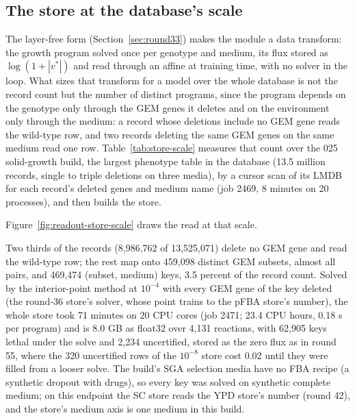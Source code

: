 \subsection{The store at the database's scale}
\label{sec:store-scale}

The layer-free form (Section~\ref{sec:round33}) makes the module a data transform: the
growth program solved once per genotype and medium, its flux stored as
$\log(1 + |v^*|)$ and read through an affine at training time, with no solver in the
loop. What sizes that transform for a model over the whole database is not the record
count but the number of distinct programs, since the program depends on the genotype
only through the GEM genes it deletes and on the environment only through the medium:
a record whose deletions include no GEM gene reads the wild-type row, and two records
deleting the same GEM genes on the same medium read one row. Table~\ref{tab:store-scale}
measures that count over the 025 solid-growth build, the largest phenotype table in the
database (13.5 million records, single to triple deletions on three media), by a cursor
scan of its LMDB for each record's deleted genes and medium name (job 2469, 8 minutes
on 20 processes), and then builds the store.

Figure~\ref{fig:readout-store-scale} draws the read at that scale.




Two thirds of the records (8,986,762 of 13,525,071) delete no GEM gene and read the
wild-type row; the rest map onto 459,098 distinct GEM subsets, almost all pairs, and
469,474 (subset, medium) keys, 3.5 percent of the record count. Solved by the
interior-point method at $10^{-4}$ with every GEM gene of the key deleted (the round-36
store's solver, whose point trains to the pFBA store's number), the whole store took 71
minutes on 20 CPU cores (job 2471; 23.4 CPU hours, 0.18 s per program) and is 8.0 GB
as float32 over 4,131 reactions, with 62,905 keys lethal under the solve and 2,234
uncertified, stored as the zero flux as in round 55, where the 320 uncertified rows of
the $10^{-8}$ store cost 0.02 until they were filled from a looser solve. The build's
SGA selection media have no FBA recipe (a synthetic dropout with drugs), so every key
was solved on synthetic complete medium; on this endpoint the SC store reads the YPD
store's number (round 42), and the store's medium axis is one medium in this build.

